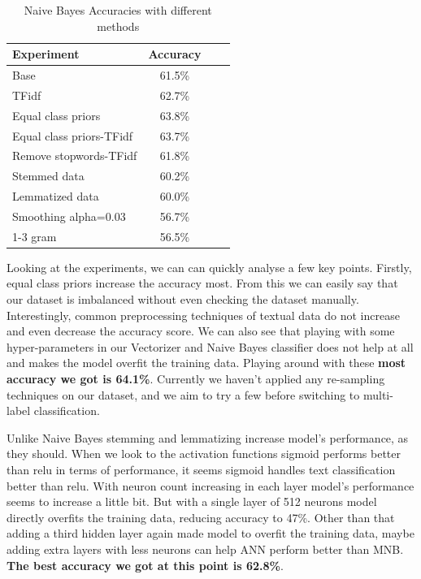 \documentclass{article}
\begin{document}
\begin{table}[htb]
\caption{Naive Bayes Accuracies with different methods}

\vskip 0.15in
\begin{center}
\begin{small}
\begin{sc}
\begin{tabular}{lccr}
\toprule
Experiment & Accuracy \\
\midrule
 Base                	  & 61.5\% \\
 TFidf                	  & 62.7\% \\
 Equal class priors      & 63.8\% \\
 Equal class priors-TFidf& 63.7\% \\
 Remove stopwords-TFidf  & 61.8\% \\
 Stemmed data        	  & 60.2\% \\
 Lemmatized data      	  & 60.0\% \\
 Smoothing alpha=0.03    & 56.7\% \\
 1-3 gram                & 56.5\% \\
 
\bottomrule
\end{tabular}
\end{sc}
\end{small}
\end{center}
\vskip -0.1in
\end{table}

Looking at the experiments, we can can quickly analyse a few key points. Firstly, equal class priors increase the accuracy most. From this we can easily say that our dataset is imbalanced without even checking the dataset manually. Interestingly, common preprocessing techniques of textual data do not increase and even decrease the accuracy score. We can also see that playing with some hyper-parameters in our Vectorizer and Naive Bayes classifier does not help at all and makes the model overfit the training data. Playing around with these \textbf{most accuracy we got is 64.1\%}. Currently we haven't applied any re-sampling techniques on our dataset, and we aim to try a few before switching to multi-label classification.

Unlike Naive Bayes stemming and lemmatizing increase model's performance, as they should. When we look to the activation functions sigmoid performs better than relu in terms of performance, it seems sigmoid handles text classification better than relu. With neuron count increasing in each layer model's performance seems to increase a little bit. But with a single layer of 512 neurons model directly overfits the training data, reducing accuracy to 47\%. Other than that adding a third hidden layer again made model to overfit the training data, maybe adding extra layers with less neurons can help ANN perform better than MNB. \textbf{The best accuracy we got at this point is 62.8\%}.
\end{document}
